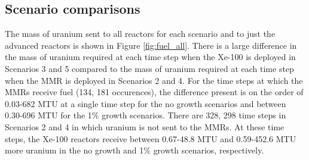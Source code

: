 \subsection{Scenario comparisons}
The mass of uranium sent to all reactors for each scenario and to just the 
advanced reactors is shown in Figure \ref{fig:fuel_all}. There is a 
large difference in the mass of uranium required at each time step when the Xe-100
is deployed in Scenarios 3 and 5 compared to the mass of uranium required at each 
time step when the \gls{MMR} is deployed in Scenarios 2 and 4. For the time 
steps at which the \glspl{MMR} receive fuel (134, 181 occurences), the difference present 
is on the order of 0.03-682 MTU at a single time step for the no growth scenarios and 
between 0.30-696 MTU for the 1\% growth scenarios. There are 328, 298 time steps 
in Scenarios 2 and 4 in which uranium is not sent to the \glspl{MMR}. At these time 
steps, the Xe-100 reactors receive between 0.67-48.8 MTU and 0.59-452.6 MTU more uranium 
in the no growth and 1\% growth scenarios, respectively. 


